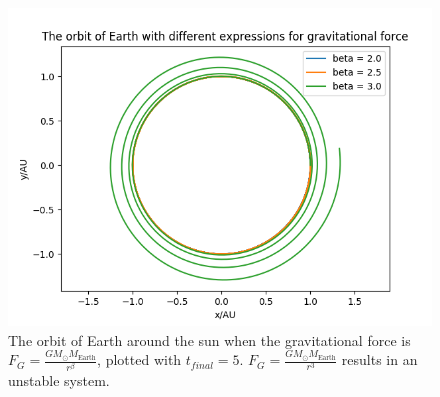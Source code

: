 \documentclass{article}
\begin{document}
\begin{figure}
  \includegraphics[width=\linewidth]{gravitationalForce.png}
  \caption{The orbit of Earth around the sun when the gravitational force is $F_G=\frac{GM_{\odot}M_{\mathrm{Earth}}}{r^{\beta}}$, plotted with $t_{final} = 5$. $F_G=\frac{GM_{\odot}M_{\mathrm{Earth}}}{r^{3}}$ results in an unstable system.}
  \label{fig:gravitationalForce}
\end{figure}
\end{document}
